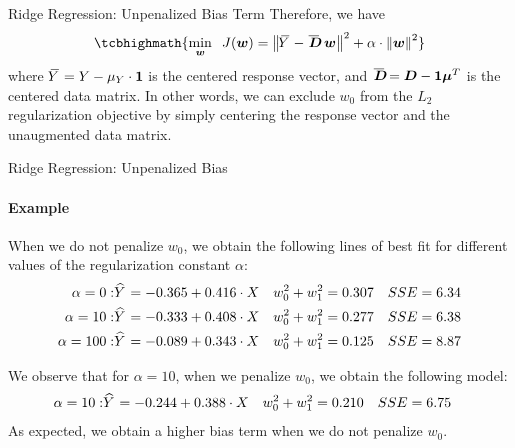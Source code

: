 \begin{frame}{Ridge Regression: Unpenalized Bias Term}
Therefore, we have
\begin{align}
    \tcbhighmath{
     \min_\bw\;\; J(\bw) = \norm{\mY - \mbD\;\bw}^2 + \alpha \cdot
 \norm{\bw}^2}
 \label{eq:reg:linear:ridgeobj_unpenalizedbias}
\end{align}
    where $\mkern 1.5mu\overline{\mkern-4.0muY}\mkern 1.5mu = Y - \mu_Y \cdot \mathbf{1}$ 
    is the centered response vector, and $\mbD = \bD - \bone \bmu^T$ is the
    centered data matrix.
    In other words, we can exclude $w_0$ from the $L_2$ regularization
    objective by simply centering the response vector and the
    unaugmented data matrix. 
\end{frame}
%
%
%
\begin{frame}{Ridge Regression: Unpenalized Bias}
\framesubtitle{Example}
When we do not penalize
    $w_0$, we obtain the following 
    lines of best
    fit for different values of the regularization constant $\alpha$:
    \begin{align*}
        \alpha = 0: & \mkern 1.5mu\widehat{\mkern-1.5muY}\mkern 1.5mu = -0.365 + 0.416 \cdot X 
        & w_0^2+w_1^2 & = 0.307 
        & SSE & = 6.34\\
        \alpha = 10: & \mkern 1.5mu\widehat{\mkern-1.5muY}\mkern 1.5mu = -0.333 + 0.408 \cdot X
        & w_0^2 +w_1^2 & = 0.277
       & SSE & = 6.38 \\
       \alpha = 100: & \mkern 1.5mu\widehat{\mkern-1.5muY}\mkern 1.5mu = -0.089 + 0.343 \cdot X
       & w_0^2+w_1^2 & = 0.125
       & SSE & = 8.87
    \end{align*}

We observe that for $\alpha=10$,
    when we penalize $w_0$, we obtain the following model:
    \begin{align*}
        \alpha = 10: & \mkern 1.5mu\widehat{\mkern-1.5muY}\mkern 1.5mu = -0.244 + 0.388 \cdot X
        & w_0^2+w_1^2 & = 0.210
       & SSE & = 6.75
    \end{align*}
    As expected, we obtain a higher bias term when we
    do not penalize $w_0$.

\end{frame}
